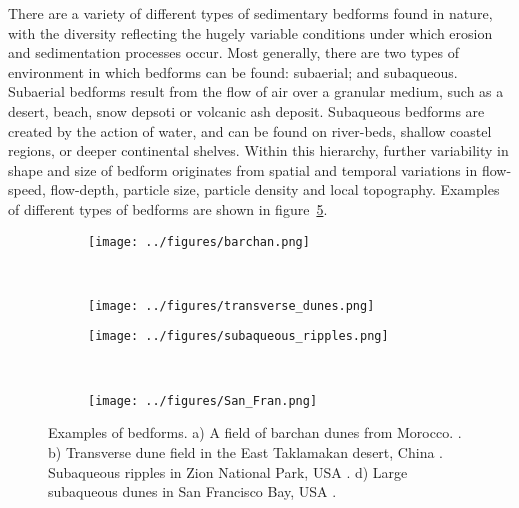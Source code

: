 \documentclass[12pt]{article}
\begin{document}
There are a variety of different types of sedimentary bedforms found in nature, with the diversity reflecting the hugely variable conditions under which erosion and sedimentation processes occur. Most generally, there are two types of environment in which bedforms can be found: subaerial; and subaqueous. Subaerial bedforms result from the flow of air over a granular medium, such as a desert, beach, snow depsoti or volcanic ash deposit. Subaqueous bedforms are created by the action of water, and can be found on river-beds, shallow coastel regions, or deeper continental shelves. Within this hierarchy, further variability in shape and size of bedform originates from spatial and temporal variations in flow-speed, flow-depth, particle size, particle density and local topography. Examples of different types of bedforms are shown in figure~\ref{fig:bedforms}.


\begin{figure}
    \centering
    \begin{subfigure}[b]{0.45\textwidth}
        \texttt{[image: ../figures/barchan.png]}
        \caption{}
        \label{fig:barchan}
    \end{subfigure}
    ~ %
    \begin{subfigure}[b]{0.45\textwidth}
        \texttt{[image: ../figures/transverse\_dunes.png]}
        \caption{}
        \label{fig:trans}
    \end{subfigure}

    \begin{subfigure}[b]{0.45\textwidth}
        \texttt{[image: ../figures/subaqueous\_ripples.png]}
        \caption{}
        \label{fig:subaq_rip}
    \end{subfigure}
    ~ %
    \begin{subfigure}[b]{0.45\textwidth}
        \texttt{[image: ../figures/San\_Fran.png]}
        \caption{}
        \label{fig:SF}
    \end{subfigure}

    \caption{Examples of bedforms. a) A field of barchan dunes from Morocco. \citep{Duran11}. b) Transverse dune field in the East Taklamakan desert, China \citep{Gao15}. Subaqueous ripples in Zion National Park, USA \citep{Andreotti12}. d) Large subaqueous dunes in San Francisco Bay, USA \citep{Barnard06}.\label{fig:bedforms}}
\end{figure}
\end{document}
